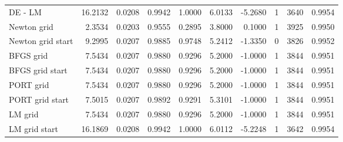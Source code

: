 \begin{tabular}{lrrrrrrrrr}
  \color{red} DE - LM & \color{red} 16.2132 & \color{red} 0.0208 & \color{red} 0.9942 & \color{red} 1.0000 & \color{red} 6.0133 & \color{red} -5.2680 & \color{red} 1 & \color{red} 3640 & \color{red} 0.9954 \\ 
  Newton grid & 2.3534 & 0.0203 & 0.9555 & 0.2895 & 3.8000 & 0.1000 & 1 & 3925 & 0.9950 \\ 
  \color{red} Newton grid start & \color{red} 9.2995 & \color{red} 0.0207 & \color{red} 0.9885 & \color{red} 0.9748 & \color{red} 5.2412 & \color{red} -1.3350 & \color{red} 0 & \color{red} 3826 & \color{red} 0.9952 \\ 
  BFGS grid & 7.5434 & 0.0207 & 0.9880 & 0.9296 & 5.2000 & -1.0000 & 1 & 3844 & 0.9951 \\ 
  \color{red} BFGS grid start & \color{red} 7.5434 & \color{red} 0.0207 & \color{red} 0.9880 & \color{red} 0.9296 & \color{red} 5.2000 & \color{red} -1.0000 & \color{red} 1 & \color{red} 3844 & \color{red} 0.9951 \\ 
  PORT grid & 7.5434 & 0.0207 & 0.9880 & 0.9296 & 5.2000 & -1.0000 & 1 & 3844 & 0.9951 \\ 
  PORT grid start & 7.5015 & 0.0207 & 0.9892 & 0.9291 & 5.3101 & -1.0000 & 1 & 3844 & 0.9951 \\ 
  LM grid & 7.5434 & 0.0207 & 0.9880 & 0.9296 & 5.2000 & -1.0000 & 1 & 3844 & 0.9951 \\ 
  \color{red} LM grid start & \color{red} 16.1869 & \color{red} 0.0208 & \color{red} 0.9942 & \color{red} 1.0000 & \color{red} 6.0112 & \color{red} -5.2248 & \color{red} 1 & \color{red} 3642 & \color{red} 0.9954 \\ 
   \hline
\end{tabular}
